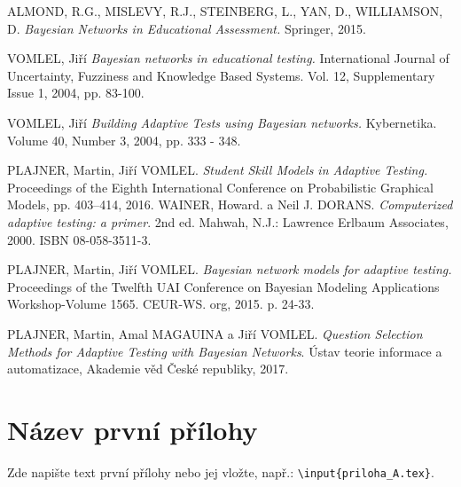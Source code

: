 \documentclass[a4paper,twoside,12pt]{book}
\begin{document}
\begin{thebibliography}{99}
	 ALMOND, R.G., MISLEVY, R.J., STEINBERG, L., YAN, D., WILLIAMSON, D. \textit{Bayesian Networks in Educational Assessment.} Springer, 2015.

	 VOMLEL, Jiří \textit{Bayesian networks in educational testing.} International Journal of Uncertainty, Fuzziness and Knowledge Based Systems. Vol. 12, Supplementary Issue 1, 2004, pp. 83-100.

	 VOMLEL, Jiří \textit{Building Adaptive Tests using Bayesian networks.} Kybernetika. Volume 40, Number 3, 2004, pp. 333 - 348.

	 PLAJNER, Martin, Jiří VOMLEL. \textit{Student Skill Models in Adaptive Testing.} Proceedings of the Eighth International Conference on Probabilistic Graphical Models, pp. 403–414, 2016.
	 WAINER, Howard. a Neil J. DORANS. \textit{Computerized adaptive testing: a primer}. 2nd ed. Mahwah, N.J.: Lawrence Erlbaum Associates, 2000. ISBN 08-058-3511-3.

	 PLAJNER, Martin, Jiří VOMLEL. \textit{Bayesian network models for adaptive testing.} Proceedings of the Twelfth UAI Conference on Bayesian Modeling Applications Workshop-Volume 1565. CEUR-WS. org, 2015. p. 24-33.

	 PLAJNER, Martin, Amal MAGAUINA a Jiří VOMLEL. \textit{Question Selection Methods for Adaptive Testing with Bayesian Networks}. Ústav teorie informace a automatizace, Akademie věd České republiky, 2017.

\end{thebibliography}


\newpage %
\appendix %



\chapter{Název první přílohy}
%
Zde napište text první přílohy nebo jej vložte, např.: \texttt{\textbackslash input\{priloha\_A.tex\}}.
%
\end{document}
